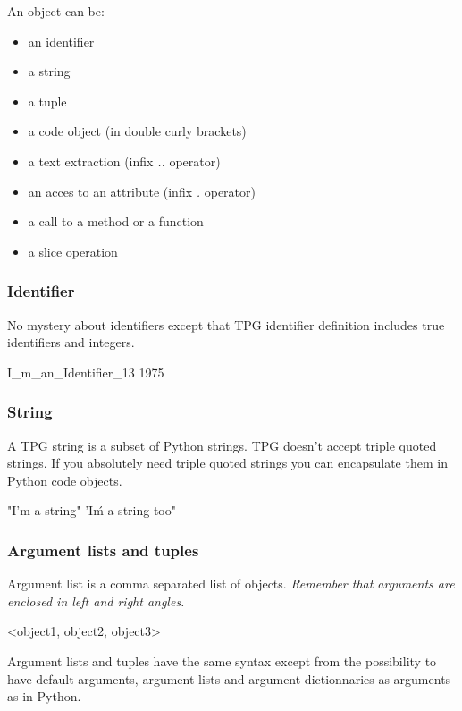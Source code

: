 An object can be:
\begin{itemize}
	\item an identifier
	\item a string
	\item a tuple
	\item a code object (in double curly brackets)
	\item a text extraction (infix \emph{..} operator)
	\item an acces to an attribute (infix \emph{.} operator)
	\item a call to a method or a function
	\item a slice operation
\end{itemize}

\subsubsection{Identifier}

No mystery about identifiers except that TPG identifier definition includes true identifiers and integers.

\begin{verbatimtab}[4]
	I_m_an_Identifier_13
	1975
\end{verbatimtab}

\subsubsection{String}

A TPG string is a subset of Python strings.
TPG doesn't accept triple quoted strings.
If you absolutely need triple quoted strings you can encapsulate them in Python code objects.

\begin{verbatimtab}[4]
	"I'm a string"
	'I\'m a string too"
\end{verbatimtab}

\subsubsection{Argument lists and tuples}

Argument list is a comma separated list of objects.
\emph{Remember that arguments are enclosed in left and right angles.}

\begin{verbatimtab}[4]
	<object1, object2, object3>
\end{verbatimtab}

Argument lists and tuples have the same syntax except from the possibility to have
default arguments, argument lists and argument dictionnaries as arguments as in Python.

